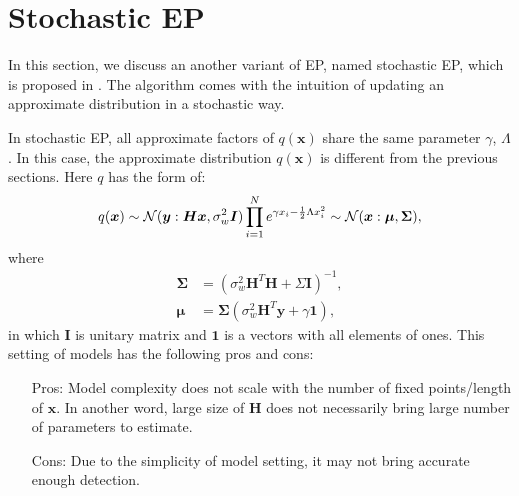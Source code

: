 \documentclass{article}
\begin{document}
\section{Stochastic EP}\label{sec:stochasticEP}
In this section, we discuss an another variant of EP, named stochastic EP, which is proposed in \cite{yingzhen2015stochastic_ep}. The algorithm comes with the intuition of updating an approximate distribution in a stochastic way.

In stochastic EP, all approximate factors of $q(\bm{x})$ share the same parameter $\gamma$, $\Lambda$. In this case, the approximate distribution $q(\bm{x})$ is different from the previous sections. Here $q$ has the form of:
\begin{equation}
  q(\bm{x}) \sim \mathcal{N}(\bm{y}: \bm{H}\bm{x}, \sigma_w^2 \bm{I}) \prod_{i=1}^{N} e^{\gamma x_i - \frac{1}{2}\Lambda x_i^2} \sim \mathcal{N}(\bm{x}: \bm{\mu}, \bm{\Sigma}),
\end{equation}
where
\begin{align}
  \bm{\Sigma} &= (\sigma_w^2\bm{H}^T\bm{H} + \Sigma \bm{I})^{-1},\\
  \bm{\mu} & = \bm{\Sigma} ( \sigma_w^2\bm{H}^T\bm{y} + \gamma \bm{1}),
\end{align}
in which $\bm{I}$ is unitary matrix and $\bm{1}$ is a vectors with all elements of ones. This setting of models has the following pros and cons:
\begin{itemize}
\item[Pros:] Model complexity does not scale with the number of fixed points/length of $\bm{x}$. In another word, large size of $\bm{H}$ does not necessarily bring large number of parameters to estimate.
\item[Cons:] Due to the simplicity of model setting, it may not bring accurate enough detection.
\end{itemize}
\end{document}
